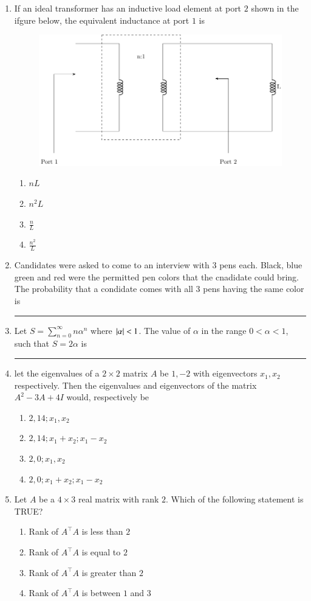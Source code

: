 \documentclass[journal]{IEEEtran}
\begin{document}
\begin{enumerate}
\item If an ideal transformer has an inductive load element at port $2$ shown in the ifgure below, the equivalent inductance at port $1$ is
\begin{figure}[H]
			\centering
			\includegraphics[scale=0.75]{figs/q25.png}
			\label{stemplot}
		\end{figure}
\begin{enumerate}
	\item $nL$ 
		\item $n^2L$ 
	\item $\frac{n}{L}$ 
	\item $\frac{n^2}{L}$
\end{enumerate}
\item Candidates were asked to come to an interview with $3$ pens each. Black, blue green and red were the permitted pen colors that the cnadidate could bring. The probability that a condidate comes with all $3$ pens having the same color is \rule{2cm}{0.2pt}

\item Let $S=\sum_{n=0}^{\infty}n\alpha^n$ where $\left\vert\alpha\right\vert<1$. The value of $\alpha$ in the range $0<\alpha<1$, such that $S=2\alpha$ is \rule{2cm}{0.2pt} 
\item let the eigenvalues of a $2\times2$ matrix $A$ be $1,-2$ with eigenvectors $x_1,x_2$ respectively. Then the eigenvalues and eigenvectors of the matrix $A^2-3A+4I$ would, respectively be 
	\begin{enumerate}
        \item $2,14;x_1,x_2$
        \item $2,14;x_1+x_2;x_1-x_2$
        \item $2,0;x_1,x_2$ 
		\item $2,0;x_1+x_2;x_1-x_2$
\end{enumerate}
\item Let $A$ be a $4\times3$ real matrix with rank $2$. Which  of the following statement is TRUE? 
	\begin{enumerate}
	\item Rank of $A^{\top}A$ is less than $2$ 
	\item Rank of $A^{\top}A$ is equal to $2$
	\item Rank of $A^{\top}A$ is greater than $2$ 
	\item Rank of $A^{\top}A$ is between $1$ and $3$
\end{enumerate}

\end{enumerate}
\end{document}
